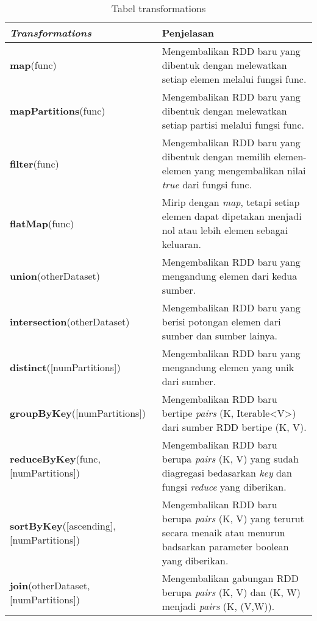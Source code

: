 \begin{table}[H] 
	\centering 
	\caption{Tabel transformations}
	\label{tab:trans}
	\begin{tabular}{p{6cm}p{9cm}}
		\toprule[1.5pt]
\hline
		 \textbf{\textit{Transformations}} & Penjelasan \\
\hline
\midrule

\hline
\textbf{map}(func) & Mengembalikan RDD baru yang dibentuk dengan melewatkan setiap elemen melalui fungsi func. \\
\hline

\textbf{mapPartitions}(func) & Mengembalikan RDD baru yang dibentuk dengan melewatkan setiap partisi melalui fungsi func.\\

\hline

\textbf{filter}(func) & Mengembalikan RDD baru yang dibentuk dengan memilih elemen-elemen yang mengembalikan nilai \textit{true} dari fungsi func. \\
\hline

\textbf{flatMap}(func) & Mirip dengan \textit{map}, tetapi setiap elemen dapat dipetakan menjadi nol atau lebih elemen sebagai keluaran. \\
\hline


\textbf{union}(otherDataset) & Mengembalikan RDD baru yang mengandung elemen dari kedua sumber.\\

\hline
\textbf{intersection}(otherDataset) & Mengembalikan RDD baru yang berisi potongan elemen dari sumber dan sumber lainya.\\ 

\hline
\textbf{distinct}([numPartitions]) & Mengembalikan RDD baru yang mengandung elemen yang unik dari sumber.\\

\hline
\textbf{groupByKey}([numPartitions]) & Mengembalikan RDD baru bertipe \textit{pairs}  (K, Iterable<V>) dari sumber RDD bertipe (K, V).\\


\hline
\textbf{reduceByKey}(func,[numPartitions]) & Mengembalikan RDD baru berupa \textit{pairs} (K, V) yang sudah diagregasi bedasarkan \textit{key} dan fungsi \textit{reduce} yang diberikan.\\

\hline
\textbf{sortByKey}([ascending], [numPartitions]) & Mengembalikan RDD baru berupa \textit{pairs}  (K, V) yang terurut secara menaik atau menurun badsarkan parameter boolean yang diberikan.\\

\hline
\textbf{join}(otherDataset, [numPartitions]) & Mengembalikan gabungan RDD berupa \textit{pairs}  (K, V) dan (K, W) menjadi \textit{pairs} (K, (V,W)).\\

\hline


\bottomrule
		
	\end{tabular} 
\end{table}

